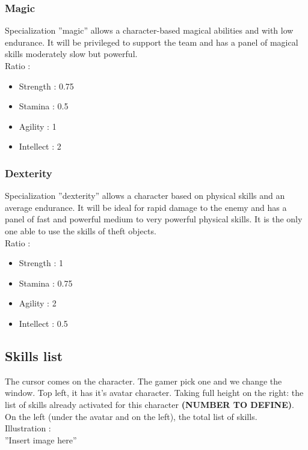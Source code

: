 \documentclass[a4paper,12pt]{book}
\begin{document}
\subsubsection{Magic}
Specialization ''magic'' allows a character-based magical abilities and with low endurance. It will be privileged to support the team and has a panel of magical skills moderately slow but powerful. \\
Ratio :
\begin{itemize}
\item Strength : 0.75
\item Stamina : 0.5
\item Agility : 1
\item Intellect : 2
\end{itemize}
\subsubsection{Dexterity}
Specialization ''dexterity'' allows a character based on physical skills and an average endurance. It will be ideal for rapid damage to the enemy and has a panel of fast and powerful medium to very powerful physical skills. It is the only one able to use the skills of theft objects. \\
Ratio :
\begin{itemize}
\item Strength : 1
\item Stamina : 0.75
\item Agility : 2
\item Intellect : 0.5
\end{itemize}
\subsection{Skills list}
The cursor comes on the character. The gamer pick one and we change the window. Top left, it has it's avatar character. Taking full height on the right: the list of skills already activated for this character \textbf{(NUMBER TO DEFINE)}. On the left (under the avatar and on the left), the total list of skills. \\ Illustration : \\ ''Insert image here''
\end{document}

